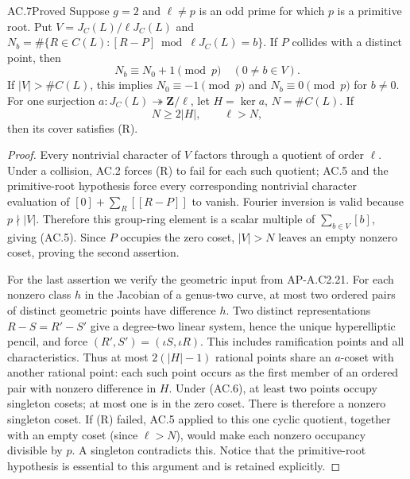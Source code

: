\begin{claim}{AC.7}{Proved}
Suppose $g=2$ and $\ell\ne p$ is an odd prime for which $p$ is a primitive
root.  Put $V=J_C(L)/\ell J_C(L)$ and
$N_b=\#\{R\in C(L):[R-P]\bmod\ell J_C(L)=b\}$.
If $P$ collides with a distinct point, then
\[
                      N_b\equiv N_0+1\pmod p
                       \quad(0\ne b\in V).               \tag{AC.5}
\]
If $|V|>\#C(L)$, this implies
$N_0\equiv-1\pmod p$ and $N_b\equiv0\pmod p$ for $b\ne0$.
For one surjection $a:J_C(L)\twoheadrightarrow\mathbf Z/\ell$,
let $H=\ker a$, $N=\#C(L)$.  If
\[
                           N\ge2|H|,
                           \qquad \ell>N,                \tag{AC.6}
\]
then its cover satisfies (R).
\end{claim}
\begin{proof}
Every nontrivial character of $V$ factors through a quotient of order
$\ell$.  Under a collision, AC.2 forces (R) to fail for each such quotient;
AC.5 and the primitive-root hypothesis force every corresponding
nontrivial character evaluation of
$[0]+\sum_R[[R-P]]$ to vanish.  Fourier inversion is valid because
$p\nmid|V|$.  Therefore this group-ring element is a scalar multiple of
$\sum_{b\in V}[b]$, giving (AC.5).  Since $P$ occupies the zero coset,
$|V|>N$ leaves an empty nonzero coset, proving the second assertion.

For the last assertion we verify the geometric input from AP-A.C2.21.
For each nonzero class $h$ in the Jacobian of a genus-two curve, at most
two ordered pairs of distinct geometric points have difference $h$.
Two distinct representations $R-S=R'-S'$ give a degree-two linear
system, hence the unique hyperelliptic pencil, and force
$(R',S')=(\iota S,\iota R)$.  This includes ramification points and
all characteristics.  Thus at most $2(|H|-1)$ rational points share an
$a$-coset with another rational point: each such point occurs as the first
member of an ordered pair with nonzero difference in $H$.
Under (AC.6), at least two points occupy singleton cosets; at most one is
in the zero coset.  There is therefore a nonzero singleton coset.  If (R)
failed, AC.5 applied to this one cyclic quotient, together with an empty
coset (since $\ell>N$), would make each nonzero occupancy divisible by
$p$.  A singleton contradicts this.  Notice that the primitive-root
hypothesis is essential to this argument and is retained explicitly.
\end{proof}


